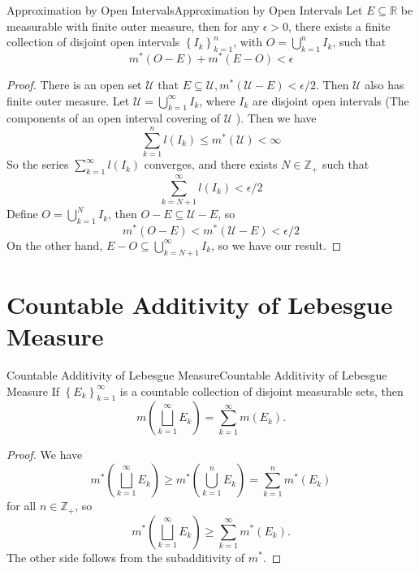 \documentclass[../main.tex]{subfiles}
\begin{document}
\begin{theorem}{Approximation by Open Intervals}{Approximation by Open Intervals}
	Let $E \subseteq \mathbb{R}$ be measurable with finite outer measure, then for any $\epsilon > 0$, there exists a finite collection of disjoint open intervals $\left\{ I_k \right\}_{k=1}^{n}$, with $O = \bigcup_{k=1}^{n} I_k$, such that
	\begin{equation*}
		m^*(O-E) + m^*(E-O) < \epsilon
	\end{equation*}
\end{theorem}
\begin{proof}
	There is an open set $\mathcal{U}$ that $E \subseteq \mathcal{U}, m^*(\mathcal{U}-E) < \epsilon / 2$. Then $\mathcal{U}$ also has finite outer measure. Let $\mathcal{U} = \bigcup_{k=1}^{\infty } I_k$, where $I_k$ are disjoint open intervals (The components of an open interval covering of $\mathcal{U}$ ). Then we have
	\begin{equation*}
		\sum_{k=1}^{n} l(I_k) \leq m^*(\mathcal{U}) < \infty
	\end{equation*}
	So the series $\sum_{k=1}^{\infty } l(I_k)$ converges, and there exists $N\in \mathbb{Z}_+$ such that
	\begin{equation*}
		\sum_{k=N+1}^{\infty } l(I_k) < \epsilon / 2
	\end{equation*}
	Define $O = \bigcup_{k=1}^{N} I_k$, then $O-E \subseteq \mathcal{U}-E$, so
	\begin{equation*}
		m^*(O-E) < m^*(\mathcal{U}-E) < \epsilon / 2
	\end{equation*}
	On the other hand, $E-O \subseteq \bigcup_{k=N+1}^{\infty } I_k$, so we have our result.
\end{proof}


\section{Countable Additivity of Lebesgue Measure}

\begin{theorem}{Countable Additivity of Lebesgue Measure}{Countable Additivity of Lebesgue Measure}
	If $\left\{ E_k \right\}_{k=1}^{\infty }$ is a countable collection of disjoint measurable sets, then
	\begin{equation*}
		m\left( \bigsqcup_{k=1}^{\infty } E_k \right) = \sum_{k=1}^{\infty } m(E_k).
	\end{equation*}
\end{theorem}
\begin{proof}
We have
\begin{equation*}
	m^*\left( \bigsqcup_{k=1}^{\infty } E_k \right) \geq m^* \left( \bigcup_{k=1}^{n} E_k \right) = \sum_{k=1}^{n} m^*(E_k)
\end{equation*}
for all $n\in \mathbb{Z}_+$, so
\begin{equation*}
	m^*\left( \bigsqcup_{k=1}^{\infty } E_k \right) \geq \sum_{k=1}^{\infty } m^*(E_k).
\end{equation*}
The other side follows from the subadditivity of $m^*$.
\end{proof}
\end{document}
